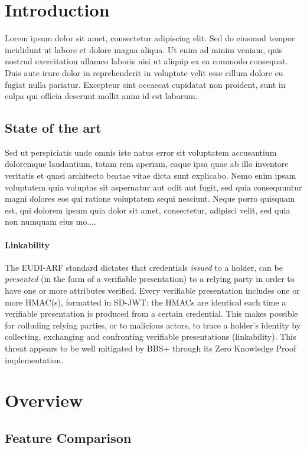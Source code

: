 \section{Introduction}
Lorem ipsum dolor sit amet, consectetur adipiscing elit. Sed do eiusmod tempor incididunt ut labore et dolore magna aliqua. Ut enim ad minim veniam, quis nostrud exercitation ullamco laboris nisi ut aliquip ex ea commodo consequat. Duis aute irure dolor in reprehenderit in voluptate velit esse cillum dolore eu fugiat nulla pariatur. Excepteur sint occaecat cupidatat non proident, sunt in culpa qui officia deserunt mollit anim id est laborum.

\subsection{State of the art}
Sed ut perspiciatis unde omnis iste natus error sit voluptatem accusantium doloremque laudantium, totam rem aperiam, eaque ipsa quae ab illo inventore veritatis et quasi architecto beatae vitae dicta sunt explicabo. Nemo enim ipsam voluptatem quia voluptas sit aspernatur aut odit aut fugit, sed quia consequuntur magni dolores eos qui ratione voluptatem sequi nesciunt. Neque porro quisquam est, qui dolorem ipsum quia dolor sit amet, consectetur, adipisci velit, sed quia non numquam eius mo....

\paragraph{Linkability}

The EUDI-ARF standard dictates that credentials \textit{issued} to a
holder, can be \textit{presented} (in the form of a verifiable
presentation) to a relying party in order to have one or more
attributes verified. Every verifiable presentation includes one or
more HMAC(s), formatted in SD-JWT: the HMACs are identical each time a
verifiable presentation is produced from a certain credential. This
makes possible for colluding relying parties, or to malicious actors,
to trace a holder's identity by collecting, exchanging and confronting
verifiable presentations (linkability). This threat appears to be well
mitigated by BBS+ through its Zero Knowledge Proof implementation.

\section{Overview}

\subsection{Feature Comparison}

